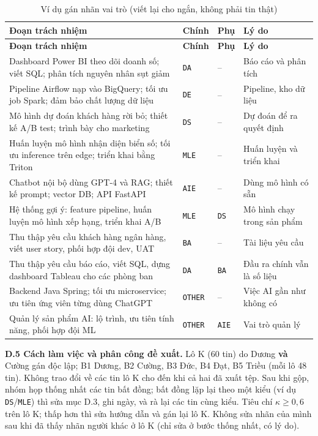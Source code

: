 \documentclass[12pt]{article}
\newcommand{\code}[1]{\texttt{#1}}
\begin{document}
\begin{longtable}{>{\raggedright\arraybackslash}p{7.6cm} >{\raggedright\arraybackslash}p{1.3cm} >{\raggedright\arraybackslash}p{1.2cm} >{\raggedright\arraybackslash}p{4.3cm}}
\caption{Ví dụ gán nhãn vai trò (viết lại cho ngắn, không phải tin thật)}\label{tab:role-examples}\\
\toprule
\textbf{Đoạn trách nhiệm} & \textbf{Chính} & \textbf{Phụ} & \textbf{Lý do} \\
\midrule
\endfirsthead
\toprule
\textbf{Đoạn trách nhiệm} & \textbf{Chính} & \textbf{Phụ} & \textbf{Lý do} \\
\midrule
\endhead
Dashboard Power BI theo dõi doanh số; viết SQL; phân tích nguyên nhân sụt giảm & \code{DA} & -- & Báo cáo và phân tích \\
Pipeline Airflow nạp vào BigQuery; tối ưu job Spark; đảm bảo chất lượng dữ liệu & \code{DE} & -- & Pipeline, kho dữ liệu \\
Mô hình dự đoán khách hàng rời bỏ; thiết kế A/B test; trình bày cho marketing & \code{DS} & -- & Dự đoán để ra quyết định \\
Huấn luyện mô hình nhận diện biển số; tối ưu inference trên edge; triển khai bằng Triton & \code{MLE} & -- & Huấn luyện và triển khai \\
Chatbot nội bộ dùng GPT-4 và RAG; thiết kế prompt; vector DB; API FastAPI & \code{AIE} & -- & Dùng mô hình có sẵn \\
Hệ thống gợi ý: feature pipeline, huấn luyện mô hình xếp hạng, triển khai A/B & \code{MLE} & \code{DS} & Mô hình chạy trong sản phẩm \\
Thu thập yêu cầu khách hàng ngân hàng, viết user story, phối hợp đội dev, UAT & \code{BA} & -- & Tài liệu yêu cầu \\
Thu thập yêu cầu báo cáo, viết SQL, dựng dashboard Tableau cho các phòng ban & \code{DA} & \code{BA} & Đầu ra chính vẫn là số liệu \\
Backend Java Spring; tối ưu microservice; ưu tiên ứng viên từng dùng ChatGPT & \code{OTHER} & -- & Việc AI gần như không có \\
Quản lý sản phẩm AI: lộ trình, ưu tiên tính năng, phối hợp đội ML & \code{OTHER} & \code{AIE} & Vai trò quản lý \\
\bottomrule
\end{longtable}

\textbf{D.5 Cách làm việc và phân công đề xuất.} Lô K (60 tin) do Dương \textbf{và} Cường gán độc lập; B1 Dương, B2 Cường, B3 Đức, B4 Đạt, B5 Triều (mỗi lô 48 tin). Không trao đổi về các tin lô K cho đến khi cả hai đã xuất tệp. Sau khi gộp, nhóm họp thống nhất các tin bất đồng; bất đồng lặp lại theo một kiểu (ví dụ \code{DS}/\code{MLE}) thì sửa mục D.3, ghi ngày, và rà lại các tin cùng kiểu. Tiêu chí $\kappa \ge 0{,}6$ trên lô K; thấp hơn thì sửa hướng dẫn và gán lại lô K. Không sửa nhãn của mình sau khi đã thấy nhãn người khác ở lô K (chỉ sửa ở bước thống nhất, có lý do).
\end{document}
